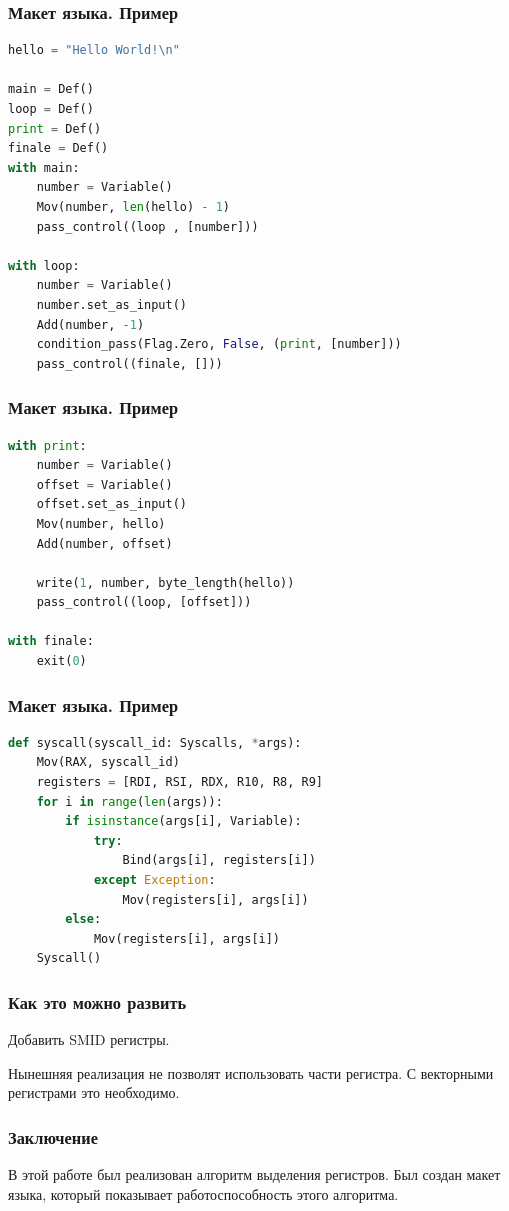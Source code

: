 \documentclass[10pt,a4paper]{beamer}
\begin{document}
\begin{frame}[fragile]
    \frametitle{Макет языка. Пример}
    \begin{lstlisting}[language=Python]
hello = "Hello World!\n"

main = Def()
loop = Def()
print = Def()
finale = Def()
with main:
    number = Variable()
    Mov(number, len(hello) - 1)
    pass_control((loop , [number]))

with loop:
    number = Variable()
    number.set_as_input()
    Add(number, -1)
    condition_pass(Flag.Zero, False, (print, [number]))
    pass_control((finale, []))

    \end{lstlisting}

\end{frame}

\begin{frame}[fragile]
    \frametitle{Макет языка. Пример}
    \begin{lstlisting}[language=Python]
with print:
    number = Variable()
    offset = Variable()
    offset.set_as_input()
    Mov(number, hello)
    Add(number, offset)

    write(1, number, byte_length(hello))
    pass_control((loop, [offset]))

with finale:
    exit(0)
    \end{lstlisting}

\end{frame}

\begin{frame}[fragile]
    \frametitle{Макет языка. Пример}
    \begin{lstlisting}[language=Python]
def syscall(syscall_id: Syscalls, *args):
    Mov(RAX, syscall_id)
    registers = [RDI, RSI, RDX, R10, R8, R9]
    for i in range(len(args)):
        if isinstance(args[i], Variable):
            try:
                Bind(args[i], registers[i])
            except Exception:
                Mov(registers[i], args[i])
        else:
            Mov(registers[i], args[i])
    Syscall()
\end{lstlisting}
\end{frame}

\begin{frame}
    \frametitle{Как это можно развить}
    Добавить SMID регистры.

    Нынешняя реализация не позволят использовать части регистра.
    С векторными регистрами это необходимо.
\end{frame}

\begin{frame}
    \frametitle{Заключение}
    В этой работе был реализован алгоритм выделения регистров.
    Был создан макет языка, который показывает работоспособность этого алгоритма.
\end{frame}


\end{document}
